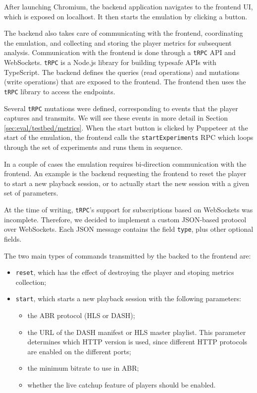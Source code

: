 After launching Chromium, the backend application navigates to the frontend UI, which is exposed on localhost. It then starts the emulation by clicking a button.

The backend also takes care of communicating with the frontend, coordinating the emulation, and collecting and storing the player metrics for subsequent analysis. Communication with the frontend is done through a \texttt{tRPC} API and WebSockets. \texttt{tRPC} is a Node.js library for building typesafe APIs with TypeScript. The backend defines the queries (read operations) and mutations (write operations) that are exposed to the frontend. The frontend then uses the \texttt{tRPC} library to access the endpoints.

Several \texttt{tRPC} mutations were defined, corresponding to events that the player captures and transmits. We will see these events in more detail in Section \ref{sec:eval/testbed/metrics}. When the start button is clicked by Puppeteer at the start of the emulation, the frontend calls the \texttt{startExperiments} RPC which loops through the set of experiments and runs them in sequence.

In a couple of cases the emulation requires bi-direction communication with the frontend. An example is the backend requesting the frontend to reset the player to start a new playback session, or to actually start the new session with a given set of parameters.

At the time of writing, \texttt{tRPC}'s support for subscriptions based on WebSockets was incomplete. Therefore, we decided to implement a custom JSON-based protocol over WebSockets. Each JSON message contains the field \texttt{type}, plus other optional fields.

The two main types of commands transmitted by the backed to the frontend are:

\begin{itemize}
    \item \texttt{reset}, which has the effect of destroying the player and stoping metrics collection;
    \item \texttt{start}, which starts a new playback session with the following parameters:
    \begin{itemize}
        \item the ABR protocol (HLS or DASH);
        \item the URL of the DASH manifest or HLS master playlist. This parameter determines which HTTP version is used, since different HTTP protocols are enabled on the different ports;
        \item the minimum bitrate to use in ABR;
        \item whether the live catchup feature of players should be enabled.
    \end{itemize}
\end{itemize}

